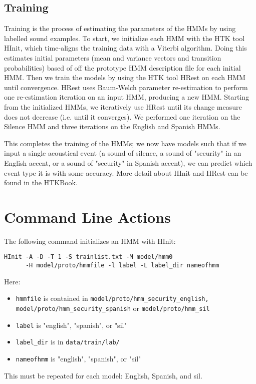 \documentclass{wileySev}
\begin{document}
\subsection{Training}
Training is the process of estimating the parameters of the HMMs by using labelled sound examples. To start, we initialize each HMM with the HTK tool HInit, which time-aligns the training data with a Viterbi algorithm. Doing this estimates initial parameters (mean and variance vectors and transition probabilities) based of off the prototype HMM description file for each initial HMM. Then we train the models by using the HTK tool HRest on each HMM until convergence. HRest uses Baum-Welch parameter re-estimation to perform one re-estimation iteration on an input HMM, producing a new HMM. Starting from the initialized HMMs, we iteratively use HRest until its change measure does not decrease (i.e. until it converges). We performed one iteration on the Silence HMM and three iterations on the English and Spanish HMMs. 

This completes the training of the HMMs; we now have models such that if we input a single acoustical event (a sound of silence, a sound of "security" in an English accent, or a sound of "security" in Spanish accent), we can predict which event type it is with some accuracy. More detail about HInit and HRest can be found in the HTKBook.

\section{Command Line Actions}
The following command initializes an HMM with HInit:
\begin{verbatim}
HInit -A -D -T 1 -S trainlist.txt -M model/hmm0 
      -H model/proto/hmmfile -l label -L label_dir nameofhmm
\end{verbatim}
Here:
\begin{itemize}
\item \texttt{hmmfile} is contained in \texttt{model/proto/hmm\_security\_english, model/proto/hmm\_security\_spanish} or \texttt{model/proto/hmm\_sil}
\item \texttt{label} is "english", "spanish", or "sil"
\item \texttt{label\_dir} is in \texttt{data/train/lab/}
\item \texttt{nameofhmm} is "english", "spanish", or "sil"
\end{itemize}
This must be repeated for each model: English, Spanish, and sil.
\end{document}
